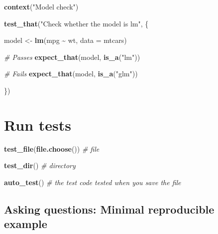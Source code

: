 \documentclass[
]{book}
\newenvironment{Shaded}{\begin{snugshade}}{\end{snugshade}}
\newcommand{\CommentTok}[1]{\textcolor[rgb]{0.56,0.35,0.01}{\textit{#1}}}
\newcommand{\DataTypeTok}[1]{\textcolor[rgb]{0.13,0.29,0.53}{#1}}
\newcommand{\KeywordTok}[1]{\textcolor[rgb]{0.13,0.29,0.53}{\textbf{#1}}}
\newcommand{\NormalTok}[1]{#1}
\newcommand{\OperatorTok}[1]{\textcolor[rgb]{0.81,0.36,0.00}{\textbf{#1}}}
\newcommand{\StringTok}[1]{\textcolor[rgb]{0.31,0.60,0.02}{#1}}
\begin{document}
\begin{Shaded}
\begin{Highlighting}[]
\KeywordTok{context}\NormalTok{(}\StringTok{"Model check"}\NormalTok{)}

\KeywordTok{test\_that}\NormalTok{(}\StringTok{"Check whether the model is lm"}\NormalTok{, \{}
  
\NormalTok{  model \textless{}{-}}\StringTok{ }\KeywordTok{lm}\NormalTok{(mpg }\OperatorTok{\textasciitilde{}}\StringTok{ }\NormalTok{wt, }\DataTypeTok{data =}\NormalTok{ mtcars)}
  
  \CommentTok{\# Passes}
  \KeywordTok{expect\_that}\NormalTok{(model, }\KeywordTok{is\_a}\NormalTok{(}\StringTok{"lm"}\NormalTok{))}

  \CommentTok{\# Fails}
  \KeywordTok{expect\_that}\NormalTok{(model, }\KeywordTok{is\_a}\NormalTok{(}\StringTok{"glm"}\NormalTok{))}

\NormalTok{\})}
\end{Highlighting}
\end{Shaded}

\hypertarget{run-tests}{%
\section{Run tests}\label{run-tests}}

\begin{Shaded}
\begin{Highlighting}[]
\KeywordTok{test\_file}\NormalTok{(}\KeywordTok{file.choose}\NormalTok{()) }\CommentTok{\# file }

\KeywordTok{test\_dir}\NormalTok{() }\CommentTok{\# directory}

\KeywordTok{auto\_test}\NormalTok{() }\CommentTok{\# the test code tested when you save the file }
\end{Highlighting}
\end{Shaded}

\hypertarget{asking-questions-minimal-reproducible-example}{%
\subsection{Asking questions: Minimal reproducible example}\label{asking-questions-minimal-reproducible-example}}
\end{document}
